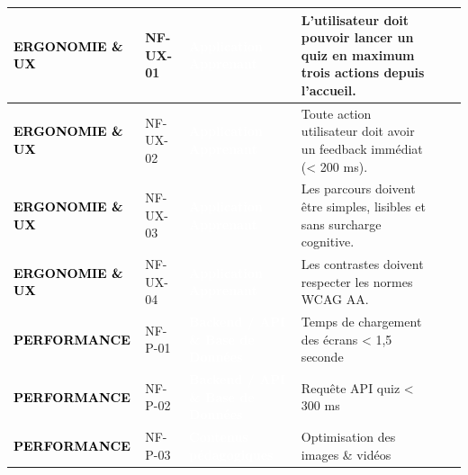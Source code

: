 \begin{longtable}{|P{2.15cm}|P{1.55cm}|P{2.35cm}|P{5.60cm}|P{1.65cm}|P{1.45cm}|}
\textcolor{black}{\textbf{ERGONOMIE \& UX}} & NF-UX-01 & \textcolor{white}{\textbf{Application Apprenant}} & L’utilisateur doit pouvoir lancer un quiz en maximum trois actions depuis l’accueil. &  &  \\ \hline
{}
\textcolor{black}{\textbf{ERGONOMIE \& UX}} & NF-UX-02 & \textcolor{white}{\textbf{Application Apprenant}} & Toute action utilisateur doit avoir un feedback immédiat (< 200 ms). &  &  \\ \hline
{}
\textcolor{black}{\textbf{ERGONOMIE \& UX}} & NF-UX-03 & \textcolor{white}{\textbf{Application Apprenant}} & Les parcours doivent être simples, lisibles et sans surcharge cognitive. &  &  \\ \hline
{}
\textcolor{black}{\textbf{ERGONOMIE \& UX}} & NF-UX-04 & \textcolor{white}{\textbf{Application Apprenant}} & Les contrastes doivent respecter les normes WCAG AA. &  &  \\ \hline
{}
\textcolor{black}{\textbf{PERFORMANCE}} & NF-P-01 & \textcolor{white}{\textbf{Backend / API \& Base de Données}} & Temps de chargement des écrans < 1,5 seconde &  &  \\ \hline
{}
\textcolor{black}{\textbf{PERFORMANCE}} & NF-P-02 & \textcolor{white}{\textbf{Backend / API \& Base de Données}} & Requête API quiz < 300 ms &  &  \\ \hline
{}
\textcolor{black}{\textbf{PERFORMANCE}} & NF-P-03 & \textcolor{white}{\textbf{Contenus pédagogiques}} & Optimisation des images \& vidéos &  &  \\ \hline

\end{longtable}
